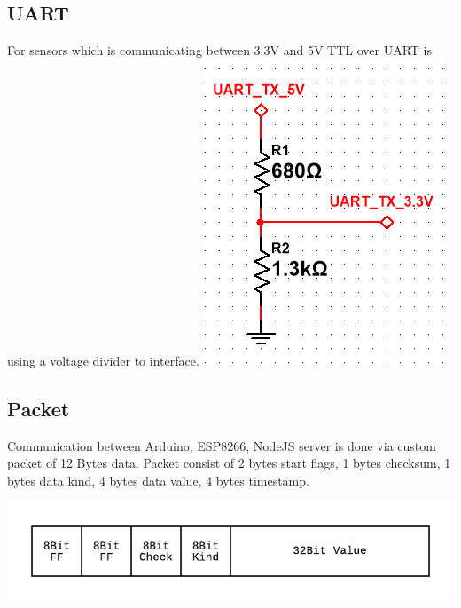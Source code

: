 \subsection{UART}
For sensors which is communicating between 3.3V and 5V TTL over UART is using a voltage divider to interface.
\includegraphics[width=\linewidth]{voltage_divider}




\subsection{Packet}
Communication between Arduino, ESP8266, NodeJS server is done via custom packet of 12 Bytes data.
Packet consist of 2 bytes start flags, 1 bytes checksum, 1 bytes data kind, 4 bytes data value, 4 bytes timestamp.

\includegraphics[width=\linewidth]{packet1}


